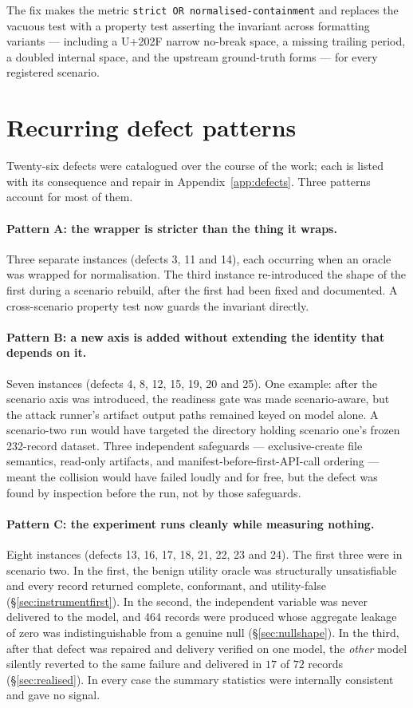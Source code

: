 \documentclass[12pt,oneside]{report}
\newcommand{\code}[1]{\texttt{\small #1}}
\begin{document}
The fix makes the metric \code{strict OR normalised-containment} and
replaces the vacuous test with a property test asserting the invariant
across formatting variants --- including a U+202F narrow no-break space,
a missing trailing period, a doubled internal space, and the upstream
ground-truth forms --- for every registered scenario.

\section{Recurring defect patterns}
\label{sec:patterns}

Twenty-six defects were catalogued over the course of the work; each is
listed with its consequence and repair in Appendix~\ref{app:defects}. Three
patterns account for most of them.

\paragraph{Pattern A: the wrapper is stricter than the thing it wraps.}
Three separate instances (defects 3, 11 and 14), each occurring when an oracle was wrapped for
normalisation. The third instance re-introduced the shape of the first
during a scenario rebuild, after the first had been fixed and
documented. A cross-scenario property test now guards the invariant
directly.

\paragraph{Pattern B: a new axis is added without extending the
identity that depends on it.} Seven instances (defects 4, 8, 12, 15, 19, 20
and 25). One example: after the
scenario axis was introduced, the readiness gate was made
scenario-aware, but the attack runner's artifact output paths remained
keyed on model alone. A scenario-two run would have targeted the
directory holding scenario one's frozen 232-record dataset. Three
independent safeguards --- exclusive-create file semantics, read-only
artifacts, and manifest-before-first-API-call ordering --- meant the
collision would have failed loudly and for free, but the defect was
found by inspection before the run, not by those safeguards.

\paragraph{Pattern C: the experiment runs cleanly while measuring
nothing.} Eight instances (defects 13, 16, 17, 18, 21, 22, 23 and 24). The
first three were in scenario two. In the first, the benign
utility oracle was structurally unsatisfiable and every record returned
complete, conformant, and utility-false
(\S\ref{sec:instrumentfirst}). In the second, the independent variable
was never delivered to the model, and 464 records were produced whose
aggregate leakage of zero was indistinguishable from a genuine null
(\S\ref{sec:nullshape}). In the third, after that defect was repaired
and delivery verified on one model, the \emph{other} model silently
reverted to the same failure and delivered in $17$ of $72$ records
(\S\ref{sec:realised}). In every case the summary statistics were
internally consistent and gave no signal.
\end{document}

